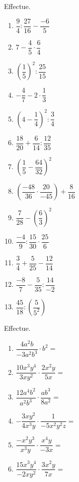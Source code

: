 \documentclass[12pt,parskip=half-, twoside=semi]{scrartcl}
\begin{document}
  \setcounter{exercise}{0} 

  \begin{exercise}
    Effectue.
    \begin{enumerate}[cols=3]    
      \item $\dfrac{9}{4}:\dfrac{27}{16} - \dfrac{-6}{5}$
      \item $7 - \dfrac{4}{5} \cdot \dfrac{6}{4}$
      \item $\left(\dfrac{1}{5}\right)^2 :\dfrac{25}{15}   $   
      \item $-\dfrac{4}{7} - 2 \cdot \dfrac{1}{3}$
      \item $\left(4 - \dfrac{1}{4}\right)^2 : \dfrac{3}{4}$
      \item $\dfrac{18}{20} + \dfrac{6}{14}:\dfrac{12}{35} $
      \item $\left(\dfrac{1}{5}-\dfrac{64}{32} \right)^2$
      \item $\left(\dfrac{-48}{36} \cdot \dfrac{20}{-45}\right) + \dfrac{8}{16}$
      \item $\dfrac{7}{28} - \left(\dfrac{6}{3}\right)^2$
      \item $\dfrac{-4}{9} : \dfrac{15}{30} \cdot \dfrac{25}{6}$
      \item $\dfrac{3}{4} + \dfrac{5}{25}- \dfrac{12}{14}$
      \item $\dfrac{-8}{7} -\dfrac{5}{35} : \dfrac{14}{-2}$
      \item $\dfrac{45}{18} : \left(\dfrac{5}{5^2}\right)$
    \end{enumerate}
  \end{exercise}

  \begin{exercise}
    Effectue.
    \begin{enumerate}[cols=2]
      \item  $\dfrac{4a^2b}{-3a^2b^3} \cdot b^2=$
      \item  $\dfrac{10x^3y^4}{3xy^2} \cdot \dfrac{2x^2y}{5x}=$
      \item  $\dfrac{12a^4b^2}{a^2b^3} \cdot \dfrac{ab^3}{8a^2}=$
      \item  $-\dfrac{3xy^2}{4x^3y} \cdot \dfrac{1}{-5x^2y^2z}=$
      \item  $\dfrac{-x^2y^3}{x^3y} \cdot \dfrac{x^4y}{-3x}=$
      \item  $\dfrac{15x^3y^4}{-2xy^2} \cdot \dfrac{3x^2y}{7x}=$
    \end{enumerate}
  \end{exercise}

  \newpage
\end{document}
